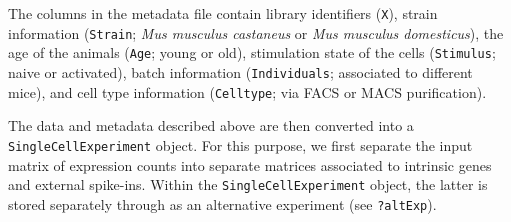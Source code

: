 \documentclass[9pt,a4paper,]{extarticle}
\newenvironment{Shaded}{\begin{snugshade}}{\end{snugshade}}
\newcommand{\CharTok}[1]{\textcolor[rgb]{0.31,0.60,0.02}{#1}}
\newcommand{\CommentTok}[1]{\textcolor[rgb]{0.56,0.35,0.01}{\textit{#1}}}
\newcommand{\ControlFlowTok}[1]{\textcolor[rgb]{0.13,0.29,0.53}{\textbf{#1}}}
\newcommand{\DataTypeTok}[1]{\textcolor[rgb]{0.13,0.29,0.53}{#1}}
\newcommand{\KeywordTok}[1]{\textcolor[rgb]{0.13,0.29,0.53}{\textbf{#1}}}
\newcommand{\NormalTok}[1]{#1}
\newcommand{\OperatorTok}[1]{\textcolor[rgb]{0.81,0.36,0.00}{\textbf{#1}}}
\newcommand{\OtherTok}[1]{\textcolor[rgb]{0.56,0.35,0.01}{#1}}
\newcommand{\StringTok}[1]{\textcolor[rgb]{0.31,0.60,0.02}{#1}}
\begin{document}
\begin{Shaded}
\end{Shaded}

The columns in the metadata file contain library identifiers (\texttt{X}), strain
information (\texttt{Strain}; \emph{Mus musculus castaneus} or \emph{Mus musculus domesticus}),
the age of the animals (\texttt{Age}; young or old), stimulation state of the cells
(\texttt{Stimulus}; naive or activated), batch information (\texttt{Individuals}; associated
to different mice), and cell type information (\texttt{Celltype}; via FACS or MACS
purification).

The data and metadata described above are then converted into a
\texttt{SingleCellExperiment} object.
For this purpose, we first separate the input matrix of expression counts into
separate matrices associated to intrinsic genes and external spike-ins.
Within the \texttt{SingleCellExperiment} object, the latter is stored separately
through as an alternative experiment (see \texttt{?altExp}).
\end{document}
